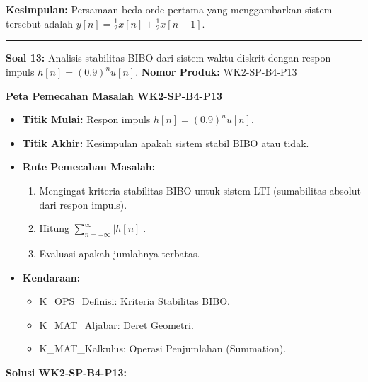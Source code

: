 \documentclass[
  letterpaper,
  DIV=11,
  numbers=noendperiod]{scrreprt}
\providecommand{\tightlist}{%
  \setlength{\itemsep}{0pt}\setlength{\parskip}{0pt}}
\begin{document}
\textbf{Kesimpulan:} Persamaan beda orde pertama yang menggambarkan
sistem tersebut adalah
\textbf{\(y[n] = \frac{1}{2} x[n] + \frac{1}{2} x[n-1]\)}.

\begin{center}\rule{0.5\linewidth}{0.5pt}\end{center}

\textbf{Soal 13:} Analisis stabilitas BIBO dari sistem waktu diskrit
dengan respon impuls \(h[n] = (0.9)^n u[n]\). \textbf{Nomor Produk:}
WK2-SP-B4-P13

\textbf{Peta Pemecahan Masalah WK2-SP-B4-P13}

\begin{itemize}
\tightlist
\item
  \textbf{Titik Mulai:} Respon impuls \(h[n] = (0.9)^n u[n]\).
\item
  \textbf{Titik Akhir:} Kesimpulan apakah sistem stabil BIBO atau tidak.
\item
  \textbf{Rute Pemecahan Masalah:}

  \begin{enumerate}
  \def\labelenumi{\arabic{enumi}.}
  \tightlist
  \item
    Mengingat kriteria stabilitas BIBO untuk sistem LTI (sumabilitas
    absolut dari respon impuls).
  \item
    Hitung \(\sum_{n=-\infty}^{\infty} |h[n]|\).
  \item
    Evaluasi apakah jumlahnya terbatas.
  \end{enumerate}
\item
  \textbf{Kendaraan:}

  \begin{itemize}
  \tightlist
  \item
    K\_OPS\_Definisi: Kriteria Stabilitas BIBO.
  \item
    K\_MAT\_Aljabar: Deret Geometri.
  \item
    K\_MAT\_Kalkulus: Operasi Penjumlahan (Summation).
  \end{itemize}
\end{itemize}

\textbf{Solusi WK2-SP-B4-P13:}
\end{document}
